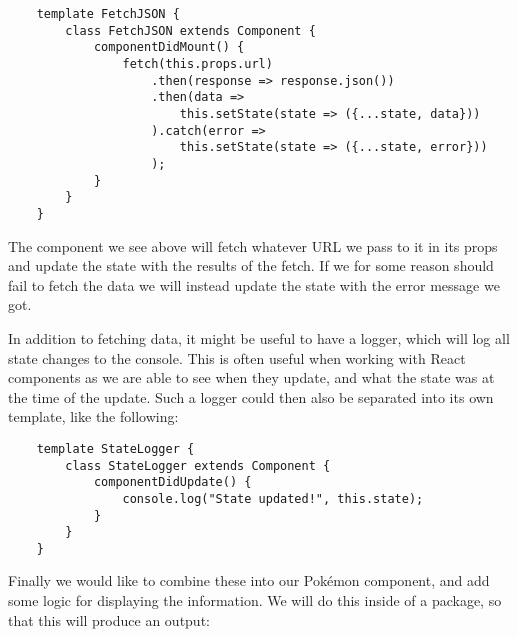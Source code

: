 \begin{verbatim}
    template FetchJSON {
        class FetchJSON extends Component {
            componentDidMount() {
                fetch(this.props.url)
                    .then(response => response.json())
                    .then(data =>
                        this.setState(state => ({...state, data}))
                    ).catch(error =>
                        this.setState(state => ({...state, error}))
                    );
            }
        }
    }
\end{verbatim}

The component we see above will fetch whatever URL we pass to it in its props and update the state with the results of the fetch.
If we for some reason should fail to fetch the data we will instead update the state with the error message we got.

In addition to fetching data, it might be useful to have a logger, which will log all state changes to the console.
This is often useful when working with React components as we are able to see when they update, and what the state was at the time of the update.
Such a logger could then also be separated into its own template, like the following:

\begin{verbatim}
    template StateLogger {
        class StateLogger extends Component {
            componentDidUpdate() {
                console.log("State updated!", this.state);
            }
        }
    }
\end{verbatim}

Finally we would like to combine these into our Pokémon component, and add some logic for displaying the information.
We will do this inside of a package, so that this will produce an output:

